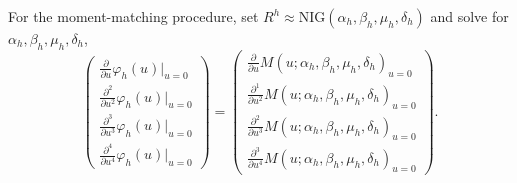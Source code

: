 For the moment-matching procedure, set
$R^h\approx \text{NIG}(\alpha_h, \beta_h, \mu_h, \delta_h)$ and solve
for $\alpha_h, \beta_h, \mu_h, \delta_h$, 
\begin{equation*}
  \begin{pmatrix}
    \frac{\partial}{\partial u} \varphi_h(u)\big|_{u=0}\\[5pt]
    \frac{\partial^2}{\partial u^2} \varphi_h(u)\big|_{u=0}\\[5pt]
    \frac{\partial^3}{\partial u^3} \varphi_h(u)\big|_{u=0}\\[5pt]
    \frac{\partial^4}{\partial u^4} \varphi_h(u)\big|_{u=0}
  \end{pmatrix}
  =
  \begin{pmatrix}
    \frac{\partial}{\partial u} M(u;\alpha_h, \beta_h, \mu_h,
    \delta_h)_{u=0}\\[5pt]
    \frac{\partial^1}{\partial u^2} M(u;\alpha_h, \beta_h, \mu_h,
    \delta_h)_{u=0}\\[5pt]
    \frac{\partial^2}{\partial u^3} M(u;\alpha_h, \beta_h, \mu_h,
    \delta_h)_{u=0}\\[5pt]
    \frac{\partial^3}{\partial u^4} M(u;\alpha_h, \beta_h, \mu_h,
    \delta_h)_{u=0}
  \end{pmatrix}.
\end{equation*}

